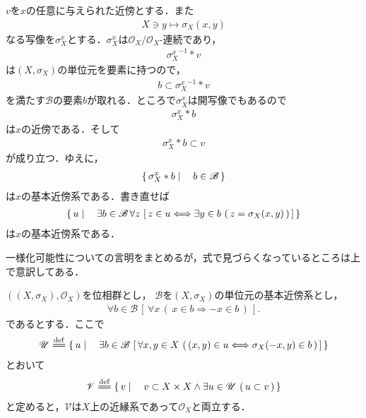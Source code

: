 	\begin{sketch}
		$v$を$x$の任意に与えられた近傍とする．また
		\begin{align}
			X \ni y \longmapsto \sigma_X(x,y)
		\end{align}
		なる写像を$\sigma_X^x$とする．$\sigma_X^x$は$\mathscr{O}_X/\mathscr{O}_X$-連続であり，
		\begin{align}
			{\sigma_X^x}^{-1} \ast v
		\end{align}
		は$\left(X,\sigma_X\right)$の単位元を要素に持つので，
		\begin{align}
			b \subset {\sigma_X^x}^{-1} \ast v
		\end{align}
		を満たす$\mathscr{B}$の要素$b$が取れる．ところで$\sigma_X^x$は開写像でもあるので
		\begin{align}
			\sigma_X^x \ast b
		\end{align}
		は$x$の近傍である．そして
		\begin{align}
			\sigma_X^x \ast b \subset v
		\end{align}
		が成り立つ．ゆえに，
		\begin{align}
			\left\{\, \sigma_X^x \ast b \mid \quad b \in \mathscr{B}\, \right\}
		\end{align}
		は$x$の基本近傍系である．書き直せば
		\begin{align}
			\left\{\, u \mid \quad \exists b \in \mathscr{B}\, 
			\forall z\, \left[\, z \in u \Longleftrightarrow \exists y \in b\, \left(\, z=\sigma_X(x,y)\, \right) \, \right]\, \right\}
		\end{align}
		は$x$の基本近傍系である．
		\QED
	\end{sketch}
	
	一様化可能性についての言明をまとめるが，式で見づらくなっているところは上で意訳してある．
	\begin{screen}
		\begin{thm}[位相群は一様化可能である]\label{thm:topological_groups_are_uniformazable}
			$\left(\left(X,\sigma_X\right),\mathscr{O}_X\right)$を位相群とし，
			$\mathscr{B}$を$\left(X,\sigma_X\right)$の単位元の基本近傍系とし，
			\begin{align}
				\forall b \in \mathscr{B}\, \left[\, \forall x\, (\, x \in b \Longrightarrow -x \in b\, )\, \right].
			\end{align}
			であるとする．ここで
			\begin{align}
				\mathscr{U} \defeq \Set{u}{\exists b \in \mathscr{B}\,
				\left[\, \forall x,y \in X\, \left(\, (x,y) \in u \Longleftrightarrow\sigma_X(-x,y) \in b\, \right)\, \right]}
			\end{align}
			とおいて
			\begin{align}
				\mathscr{V} \defeq \Set{v}{v \subset X \times X \wedge \exists u \in \mathscr{U}\, \left(\, u \subset v\, \right)}
			\end{align}
			と定めると，$\mathscr{V}$は$X$上の近縁系であって$\mathscr{O}_X$と両立する．
		\end{thm}
	\end{screen}
	
